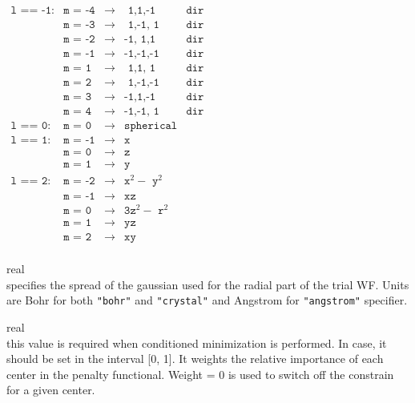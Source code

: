 {%
%
$\begin{array}{lllll}
\texttt{l == -1:}   &\texttt{m = -4}  &\rightarrow   & \texttt{ 1,1,-1}              &\texttt{dir}\\
\texttt{}           &\texttt{m = -3}  &\rightarrow   & \texttt{ 1,-1, 1}             &\texttt{dir}\\
\texttt{}           &\texttt{m = -2}  &\rightarrow   & \texttt{-1, 1,1}              &\texttt{dir}\\
\texttt{}           &\texttt{m = -1}  &\rightarrow   & \texttt{-1,-1,-1}             &\texttt{dir}\\
\texttt{}           &\texttt{m =  1}  &\rightarrow   & \texttt{ 1,1, 1}              &\texttt{dir}\\
\texttt{}           &\texttt{m =  2}  &\rightarrow   & \texttt{ 1,-1,-1}             &\texttt{dir}\\
\texttt{}           &\texttt{m =  3}  &\rightarrow   & \texttt{-1,1,-1}              &\texttt{dir}\\
\texttt{}           &\texttt{m =  4}  &\rightarrow   & \texttt{-1,-1, 1}             &\texttt{dir}\\
\texttt{l == 0:}    &\texttt{m =  0}  &\rightarrow   & \texttt{spherical}            &\texttt{}\\
\texttt{l == 1:}    &\texttt{m = -1}  &\rightarrow   & \texttt{x}                    &\texttt{}\\
\texttt{}           &\texttt{m =  0}  &\rightarrow   & \texttt{z}                    &\texttt{}\\
\texttt{}           &\texttt{m =  1}  &\rightarrow   & \texttt{y}                    &\texttt{}\\
\texttt{l == 2:}    &\texttt{m = -2}  &\rightarrow   & \texttt{x}^2 - \texttt{ y}^2  &\texttt{}\\
\texttt{}           &\texttt{m = -1}  &\rightarrow   & \texttt{xz}                   &\texttt{}\\
\texttt{}           &\texttt{m =  0}  &\rightarrow   & \texttt{3z}^2 - \texttt{ r}^2 &\texttt{}\\
\texttt{}           &\texttt{m =  1}  &\rightarrow   & \texttt{yz}                   &\texttt{}\\
\texttt{}           &\texttt{m =  2}  &\rightarrow   & \texttt{xy}                   &\texttt{}\\
\end{array}$ \par

\noindent{}%
{\sc real} \\ specifies the spread of the gaussian used for the radial part of the
trial WF. Units are Bohr for both {\tt"bohr"} and {\tt"crystal"} and Angstrom for {\tt "angstrom"}
specifier.\par

\noindent{}%
{\sc real} \\ this value is required when conditioned minimization is performed. In case,
            it should be set in the interval [0, 1]. It weights the relative importance of
            each center in the penalty functional. Weight = 0 is used to switch off the
            constrain for a given center.\par
}

